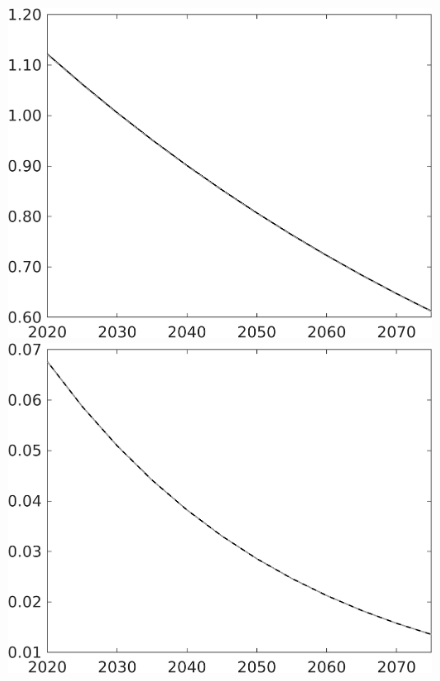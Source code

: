 \documentclass[12pt]{article}
\begin{document}
\begin{figure}[h!!]
\begin{minipage}[]{0.32\textwidth}
	\end{minipage}	
	\begin{minipage}[]{0.32\textwidth}
		\includegraphics[width=1\textwidth]{../../codding_model/own_basedOnFried/optimalPol_010922_revision/figures/all_13Sept22/CompTaul_LFBAU_Reg0_pg_spillover0_nsk0_xgr1_knspil1_sep1_countec0_GovRev0_etaa0.79_lgd0.png}
	\end{minipage}		
	\begin{minipage}[]{0.32\textwidth}
		\includegraphics[width=1\textwidth]{../../codding_model/own_basedOnFried/optimalPol_010922_revision/figures/all_13Sept22/CompTaul_LFBAU_Reg0_pepn_spillover0_nsk0_xgr1_knspil1_sep1_countec0_GovRev0_etaa0.79_lgd0.png}

\end{minipage}
\end{figure}
\end{document}

